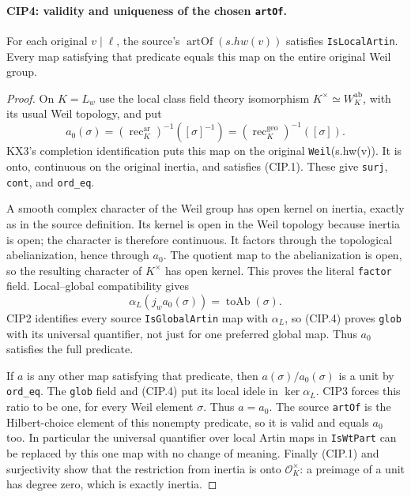 \paragraph{CIP4: validity and uniqueness of the chosen \texttt{artOf}.}
\label{claim:CIP4}
For each original $v\mid\ell$, the source's
$\operatorname{artOf}(s.hw(v))$ satisfies \texttt{IsLocalArtin}.
Every map satisfying that predicate equals this map on the entire
original Weil group.
\begin{proof}
On $K=L_w$ use the local class field theory isomorphism
$K^\times\simeq W_K^{\mathrm{ab}}$, with its usual Weil topology,
and put
\[
 a_0(\sigma)
   =(\operatorname{rec}^{\mathrm{ar}}_K)^{-1}
            ([\sigma]^{-1})
   =(\operatorname{rec}^{\mathrm{geo}}_K)^{-1}([\sigma]).
 \tag{CIP.3}
\]
KX3's completion identification puts this map on the original
\texttt{Weil}(s.hw(v)).  It is onto, continuous on the original
inertia, and satisfies (CIP.1).  These give
\texttt{surj}, \texttt{cont}, and \texttt{ord\_eq}.

A smooth complex character of the Weil group has open kernel on
inertia, exactly as in the source definition.  Its kernel is open
in the Weil topology because inertia is open; the character is
therefore continuous.  It factors through the topological
abelianization, hence through $a_0$.  The quotient map to the
abelianization is open, so the resulting character of $K^\times$
has open kernel.  This proves the
literal \texttt{factor} field.  Local--global compatibility gives
\[
 \alpha_L(j_w a_0(\sigma))=\operatorname{toAb}(\sigma).
 \tag{CIP.4}
\]
CIP2 identifies every source \texttt{IsGlobalArtin} map with
$\alpha_L$, so (CIP.4) proves \texttt{glob} with its universal
quantifier, not just for one preferred global map.  Thus $a_0$
satisfies the full predicate.

If $a$ is any other map satisfying that predicate, then
$a(\sigma)/a_0(\sigma)$ is a unit by \texttt{ord\_eq}.
The \texttt{glob} field and (CIP.4) put its local idele in
$\ker\alpha_L$.  CIP3 forces this ratio to be one, for every
Weil element $\sigma$.  Thus $a=a_0$.  The source
\texttt{artOf} is the Hilbert-choice element of this nonempty
predicate, so it is valid and equals $a_0$ too.  In particular the
universal quantifier over local Artin maps in \texttt{IsWtPart}
can be replaced by this one map with no change of meaning.
Finally (CIP.1) and surjectivity show that the restriction from
inertia is onto $\mathcal O_K^\times$: a preimage of a unit has
degree zero, which is exactly inertia.
\end{proof}

